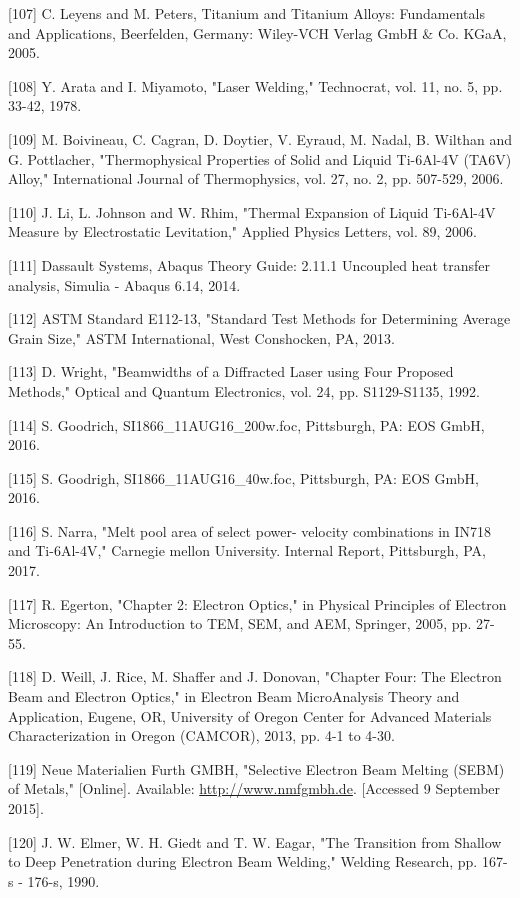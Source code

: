 \documentclass[10pt]{article}
\begin{document}
[107] C. Leyens and M. Peters, Titanium and Titanium Alloys: Fundamentals and Applications, Beerfelden, Germany: Wiley-VCH Verlag GmbH \& Co. KGaA, 2005.

[108] Y. Arata and I. Miyamoto, "Laser Welding," Technocrat, vol. 11, no. 5, pp. 33-42, 1978.

[109] M. Boivineau, C. Cagran, D. Doytier, V. Eyraud, M. Nadal, B. Wilthan and G. Pottlacher, "Thermophysical Properties of Solid and Liquid Ti-6Al-4V (TA6V) Alloy," International Journal of Thermophysics, vol. 27, no. 2, pp. 507-529, 2006.

[110] J. Li, L. Johnson and W. Rhim, "Thermal Expansion of Liquid Ti-6Al-4V Measure by Electrostatic Levitation," Applied Physics Letters, vol. 89, 2006.

[111] Dassault Systems, Abaqus Theory Guide: 2.11.1 Uncoupled heat transfer analysis, Simulia - Abaqus 6.14, 2014.

[112] ASTM Standard E112-13, "Standard Test Methods for Determining Average Grain Size," ASTM International, West Conshocken, PA, 2013.

[113] D. Wright, "Beamwidths of a Diffracted Laser using Four Proposed Methods," Optical and Quantum Electronics, vol. 24, pp. S1129-S1135, 1992.

[114] S. Goodrich, SI1866\_11AUG16\_200w.foc, Pittsburgh, PA: EOS GmbH, 2016.

[115] S. Goodrigh, SI1866\_11AUG16\_40w.foc, Pittsburgh, PA: EOS GmbH, 2016.

[116] S. Narra, "Melt pool area of select power- velocity combinations in IN718 and Ti-6Al-4V," Carnegie mellon University. Internal Report, Pittsburgh, PA, 2017.

[117] R. Egerton, "Chapter 2: Electron Optics," in Physical Principles of Electron Microscopy: An Introduction to TEM, SEM, and AEM, Springer, 2005, pp. 27-55.

[118] D. Weill, J. Rice, M. Shaffer and J. Donovan, "Chapter Four: The Electron Beam and Electron Optics," in Electron Beam MicroAnalysis Theory and Application, Eugene, OR, University of Oregon Center for Advanced Materials Characterization in Oregon (CAMCOR), 2013, pp. 4-1 to 4-30.

[119] Neue Materialien Furth GMBH, "Selective Electron Beam Melting (SEBM) of Metals," [Online]. Available: \href{http://www.nmfgmbh.de}{http://www.nmfgmbh.de}. [Accessed 9 September 2015].

[120] J. W. Elmer, W. H. Giedt and T. W. Eagar, "The Transition from Shallow to Deep Penetration during Electron Beam Welding," Welding Research, pp. 167-s - 176-s, 1990.
\end{document}
